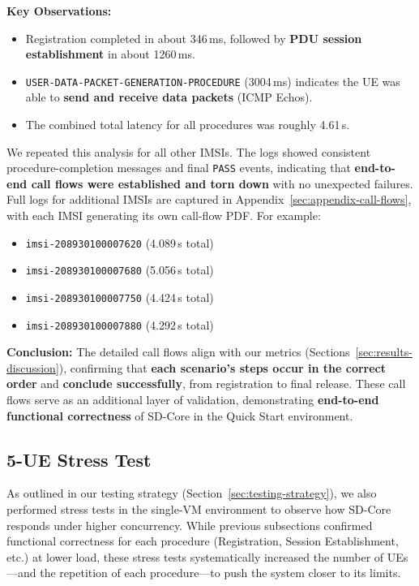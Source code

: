 \noindent
\textbf{Key Observations:}
\begin{itemize}
  \item Registration completed in about 346\,ms, followed by \textbf{PDU session establishment} in about 1260\,ms.
  \item \texttt{USER-DATA-PACKET-GENERATION-PROCEDURE} (3004\,ms) indicates the UE was able to \textbf{send and receive data packets} (ICMP Echos).
  \item The combined total latency for all procedures was roughly 4.61\,s.
\end{itemize}

We repeated this analysis for all other IMSIs. The logs showed consistent procedure-completion messages and final \texttt{PASS} events, indicating that \textbf{end-to-end call flows were established and torn down} with no unexpected failures. Full logs for additional IMSIs are captured in Appendix~\ref{sec:appendix-call-flows}, with each IMSI generating its own call-flow PDF. For example:
\begin{itemize}
    \item \texttt{imsi-208930100007620} (4.089\,s total)
    \item \texttt{imsi-208930100007680} (5.056\,s total)
    \item \texttt{imsi-208930100007750} (4.424\,s total)
    \item \texttt{imsi-208930100007880} (4.292\,s total)
\end{itemize}

\noindent
\textbf{Conclusion:} The detailed call flows align with our metrics (Sections~\ref{sec:results-discussion}), confirming that \textbf{each scenario's steps occur in the correct order} and \textbf{conclude successfully}, from registration to final release. These call flows serve as an additional layer of validation, demonstrating \textbf{end-to-end functional correctness} of SD-Core in the Quick Start environment.


\subsection{5-UE Stress Test}
\label{sssec:5UE-stress-test}
As outlined in our testing strategy (Section~\ref{sec:testing-strategy}), we also performed stress tests in the single-VM environment to observe how SD-Core responds under higher concurrency. While previous subsections confirmed functional correctness for each procedure (Registration, Session Establishment, etc.) at lower load, these stress tests systematically increased the number of UEs—and the repetition of each procedure—to push the system closer to its limits.
